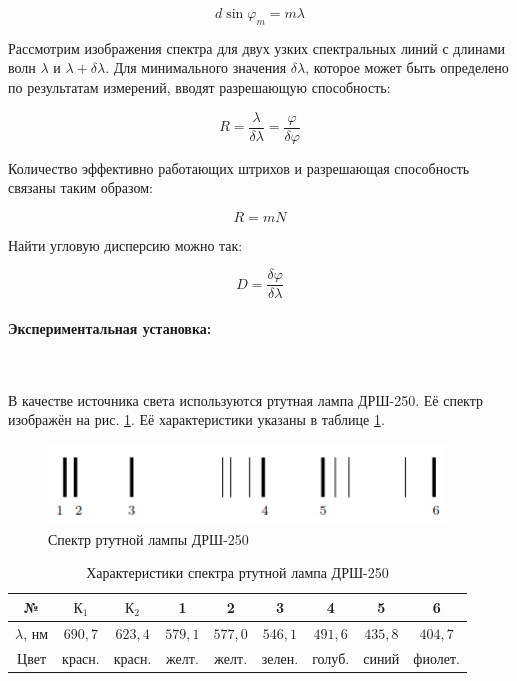 \documentclass[a4paper, 12pt]{article}
\renewcommand{\phi}{\varphi}
\newcommand{\parag}[1]{\paragraph*{#1:}}
\begin{document}
\begin{equation}
    d \sin \phi_m = m \lambda
    \label{eq:int_max}
\end{equation}

Рассмотрим изображения спектра для двух узких спектральных линий с длинами волн $\lambda$ и $\lambda + \delta \lambda$. Для минимального значения $\delta \lambda$, которое может быть определено по результатам измерений, вводят разрешающую способность:

\begin{equation}
    R = \frac{\lambda}{\delta \lambda} = \frac{\phi}{\delta \phi}
    \label{eq:R}
\end{equation}

Количество эффективно работающих штрихов и разрешающая способность связаны таким образом:

\begin{equation}
    R = m N 
    \label{eq:resolution}
\end{equation}

Найти угловую дисперсию можно так:

\begin{equation}
    D = \frac{\delta \phi}{\delta \lambda}
    \label{eq:angle_disp}
\end{equation}

\parag {Экспериментальная установка} ~

В качестве источника света используются ртутная лампа ДРШ-250. Её спектр изображён на рис. \ref{img:light}. Её характеристики указаны в таблице \ref{table:light}.

\begin{figure}[!h]
    \includegraphics[scale = 1]{Workplace2}
    \centering
    \caption{Спектр ртутной лампы ДРШ-250}
    \label{img:light}
\end{figure}

\begin{table}[!h]
    \centering
    \begin{tabular}{|c|c|c|c|c|c|c|c|c|}
        \hline
        № & $К_1$ & $К_2$ & 1 & 2 & 3 & 4 & 5 & 6 \\ \hline
        $\lambda$, нм & $690,7$ & $623,4$ & $579,1$ & $577,0$ & $546,1$ & $491,6$ & $435,8$ & $404,7$ \\ \hline
        Цвет & красн. & красн. & желт. & желт. & зелен. & голуб. & синий & фиолет. \\ \hline
    \end{tabular}
    \caption {Характеристики спектра ртутной лампа ДРШ-250}
    \label{table:light}
\end{table}
\end{document}
